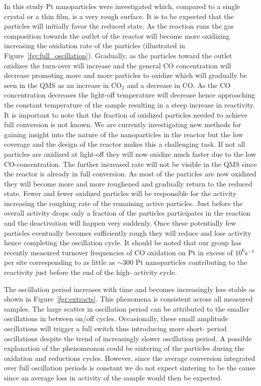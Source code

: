 \documentclass[8.5pt,twoside,twocolumn]{article}
\begin{document}
In this study Pt nanoparticles were investigated which, compared to a single
crystal or a thin film, is a very rough surface. It is to be expected that the
particles will initially favor the reduced state. As the reaction runs the gas
composition towards the outlet of the reactor will become more oxidizing
increasing the oxidation rate of the particles (illustrated in
Figure~\ref{fgr:full_oscillation}). Gradually, as the particles toward the
outlet oxidizes the turn-over will increase and the general CO concentration
will decrease promoting more and more particles to oxidize which will gradually
be seen in the QMS as an increase in CO$_2$ and a decrease in CO. As the CO
concentration decreases the light-off temperature will decrease hence
approaching the constant temperature of the sample resulting in a steep
increase in reactivity. It is important to note that the fraction of oxidized
particles needed to achieve full conversion is not known. We are currently
investigating new methods for gaining insight into the nature of the
nanoparticles in the reactor but the low coverage and the design of the reactor
makes this a challenging task. If not all particles are oxidized at light-off
they will now oxidize much faster due to the low CO-concentration. The further
increased rate will not be visible in the QMS since the reactor is already in
full conversion. As most of the particles are now oxidized they will become
more and more roughened and gradually return to the reduced state. Fewer and
fewer oxidized particles will be responsible for the activity increasing the
roughing rate of the remaining active particles. Just before the overall
activity drops only a fraction of the particles participates in the reaction
and the deactivation will happen very suddenly. Once these potentially few
particles eventually becomes sufficiently rough they will reduce and lose
activity hence completing the oscillation cycle. It should be noted that our
group has recently measured turnover frequencies of CO oxidation on Pt in
excess of $10^{6}$s$^{-1}$ per site corresponding to as little as $\sim$300 Pt
nanoparticles contributing to the reactivity just before the end of the high-
activity cycle.

The oscillation period increases with time and becomes increasingly less stable
as shown in Figure~\ref{fgr:extracts}. This phenomena is consistent across all
measured samples. The large scatter in oscillation period can be attributed to
the smaller oscillations in between on/off cycles. Occasionally, these small
amplitude oscillations will trigger a full switch thus introducing more short-
period oscillations despite the trend of increasingly slower oscillation
period. A possible explanation of the phenomeonon could be sintering of the
particles during the oxidation and reductions cycles. However, since the
average conversion integrated over full oscillation periods is constant we do
not expect sintering to be the cause since an average loss in activity of the
sample would then be expected.
\end{document}
